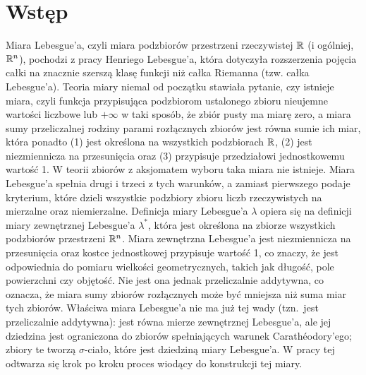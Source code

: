 \section{Wstęp}
Miara Lebesgue'a, czyli miara podzbiorów przestrzeni rzeczywistej $\mathbb{R}$ (i ogólniej, $\mathbb{R}^{n}$), pochodzi z pracy Henriego Lebesgue'a, która dotyczyła rozszerzenia pojęcia całki na znacznie szerszą klasę funkcji niż całka Riemanna (tzw. całka Lebesgue'a). Teoria miary niemal od początku stawiała pytanie, czy istnieje miara, czyli funkcja przypisująca podzbiorom ustalonego zbioru nieujemne wartości liczbowe lub $+\infty$ w taki sposób, że zbiór pusty ma miarę zero, a miara sumy przeliczalnej rodziny parami rozłącznych zbiorów jest równa sumie ich miar, która ponadto (1) jest określona na wszystkich podzbiorach $\mathbb{R}$, (2) jest niezmiennicza na przesunięcia oraz (3) przypisuje przedziałowi jednostkowemu wartość 1. W teorii zbiorów z aksjomatem wyboru taka miara nie istnieje. Miara Lebesgue'a spełnia drugi i trzeci z tych warunków, a zamiast pierwszego podaje kryterium, które dzieli wszystkie podzbiory zbioru liczb rzeczywistych na mierzalne oraz niemierzalne. Definicja miary Lebesgue'a $\lambda$ opiera się na definicji miary zewnętrznej Lebesgue'a $\lambda^{*}$, która jest określona na zbiorze wszystkich podzbiorów przestrzeni $\mathbb{R}^{n}$. Miara zewnętrzna Lebesgue'a jest niezmiennicza na przesunięcia oraz kostce jednostkowej przypisuje wartość 1, co znaczy, że jest odpowiednia do pomiaru wielkości geometrycznych, takich jak długość, pole powierzchni czy objętość. Nie jest ona jednak przeliczalnie addytywna, co oznacza, że miara sumy zbiorów rozłącznych może być mniejsza niż suma miar tych zbiorów. Właściwa miara Lebesgue'a nie ma już tej wady (tzn.\ jest przeliczalnie addytywna): jest równa mierze zewnętrznej Lebesgue'a, ale jej dziedzina jest ograniczona do zbiorów spełniających warunek Carathéodory'ego; zbiory te tworzą $\sigma$-ciało, które jest dziedziną miary Lebesgue'a. W pracy tej odtwarza się krok po kroku proces wiodący do konstrukcji tej miary.
